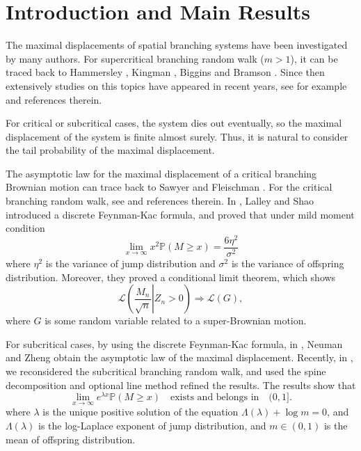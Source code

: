 \documentclass[]{article}
\numberwithin{equation}{section}
\theoremstyle{thmstyleone}%
\theoremstyle{thmstyletwo}%
\theoremstyle{thmstylethree}%
\theoremstyle{thmstylefour}%
\theoremstyle{thmstylefive}%
\theoremstyle{thmstylesix}%
\renewcommand{\P}{\mathbb{P}}
\begin{document}
\begin{abstract}
	   To deal with the challenges caused by the random environment, we formulated a ``position" indexed random work $R_x$ from the excursion of the spine. 
	    
	\end{abstract}
	
	\section{Introduction and Main Results}
	
	
	The maximal displacements of spatial branching systems have been investigated by many authors.
	For supercritical branching random walk ($m > 1$),
	it can be traced back to Hammersley \cite{Hammersley},
	Kingman \cite{Kingman}, Biggins \cite{Biggins1976} and Bramson \cite{Bramson}.
	Since then extensively studies on this topics have appeared in recent years, see for example
	\cite{Addario2009,Aidekon2013,Bachmann,Bramson2016,Bramson2009,Hu2009} 
	and references therein.
	
	For critical or subcritical cases, the system dies out eventually, 
	so the maximal displacement of the system is finite almost surely. 
	Thus, it is natural to consider the tail probability of the maximal displacement. 
	
	The asymptotic law for the maximal displacement of a critical branching Brownian motion can trace back to Sawyer and Fleischman \cite{Fleischman1979Maximun}.
	For the critical branching random walk, see \cite{Kesten1995,Lalley2015} and references therein.
	In \cite{Lalley2015}, Lalley and Shao introduced a discrete Feynman-Kac formula, and proved that under mild moment condition
	\begin{equation}\label{1}
		\lim\limits_{x\rightarrow\infty}x^2\P(M\geqslant x) = \frac{6\eta^2}{\sigma^2}
	\end{equation}
	where $\eta^2$ is the variance of jump distribution and $\sigma^2$ is the variance of offspring distribution. Moreover, they proved a conditional limit theorem, which shows
	\begin{equation}\label{2}
		\mathcal{L}\left(\left.
		\frac{M_n}{\sqrt{n}} \right|Z_n>0
		\right) \Longrightarrow \mathcal{L}(G),
	\end{equation}
	where $G$ is some random variable related to a super-Brownian motion.
	
	For subcritical cases, by using the discrete Feynman-Kac formula, in \cite{Neuman2017}, Neuman and Zheng obtain the asymptotic law of the maximal displacement. Recently, in \cite{Fu2025}, we reconsidered the subcritical branching random walk, and used the spine decomposition and optional line method refined the results. The results show that
	\begin{equation}
		\lim\limits_{x\rightarrow\infty}e^{\lambda x}\P(M\geqslant x) \quad
		\text{exists and belongs in} \quad (0,1].
	\end{equation}
	where $\lambda $ is the unique positive solution of the equation $\Lambda(\lambda)+\log m=0$, and $\Lambda(\lambda)$ is the log-Laplace exponent of jump distribution, and $m\in (0,1)$ is the mean of offspring distribution.
	
\end{document}
